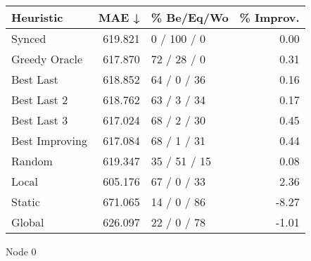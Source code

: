 \begin{tabular}{lrlr}
\toprule
\textbf{Heuristic} & \textbf{MAE ↓} & \textbf{\% Be/Eq/Wo} & \textbf{\% Improv.} \\
\midrule
            Synced &        619.821 &          0 / 100 / 0 &                0.00 \\
     Greedy Oracle &        617.870 &          72 / 28 / 0 &                0.31 \\
         Best Last &        618.852 &          64 / 0 / 36 &                0.16 \\
       Best Last 2 &        618.762 &          63 / 3 / 34 &                0.17 \\
       Best Last 3 &        617.024 &          68 / 2 / 30 &                0.45 \\
    Best Improving &        617.084 &          68 / 1 / 31 &                0.44 \\
            Random &        619.347 &         35 / 51 / 15 &                0.08 \\
             Local &        605.176 &          67 / 0 / 33 &                2.36 \\
            Static &        671.065 &          14 / 0 / 86 &               -8.27 \\
            Global &        626.097 &          22 / 0 / 78 &               -1.01 \\
\bottomrule
\end{tabular}
\caption{Node 0}
\label{tab:iid_lr01_le2_bs4_0}

